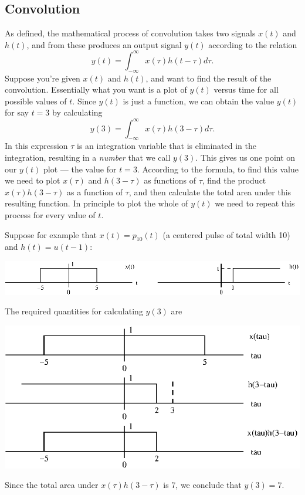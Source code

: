 \documentclass[10pt]{beamer}
\begin{document}
\subsection{Convolution}

As defined, the mathematical process of convolution takes two signals $x(t)$ and $h(t)$, and from these produces an output signal $y(t)$ according to the relation
\begin{equation*}
  y(t) = \int_{-\infty}^\infty x(\tau) h(t - \tau) d\tau.
\end{equation*}
Suppose you're given $x(t)$ and $h(t)$, and want to find the result of the convolution.  Essentially what you want is a plot of $y(t)$ versus time for all possible values of $t$.  Since $y(t)$ is just a function, we can obtain the value $y(t)$ for say $t=3$ by calculating
\begin{equation*}
  y(3) = \int_{-\infty}^\infty x(\tau) h(3 - \tau) d\tau.
\end{equation*}
In this expression $\tau$ is an integration variable that is eliminated in the integration, resulting in a {\em number} that we call $y(3)$.  This gives us one point on our $y(t)$ plot --- the value for $t=3$.  According to the formula, to find this value we need to plot $x(\tau)$ and $h(3-\tau)$ as functions of $\tau$, find the product $x(\tau) h(3-\tau)$ as a function of $\tau$, and then calculate the total area under this resulting function.  In principle to plot the whole of $y(t)$ we need to repeat this process for every value of $t$.

Suppose for example that $x(t) = p_{10}(t)$ (a centered pulse of total width 10) and $h(t) = u(t-1)$:
\begin{center}
  \includegraphics{convexample}
\end{center}
The required quantities for calculating $y(3)$ are 
\begin{center}
  \includegraphics{convexample2}
\end{center}
Since the total area under $x(\tau) h(3-\tau)$ is 7, we conclude that $y(3) = 7$.
\end{document}

